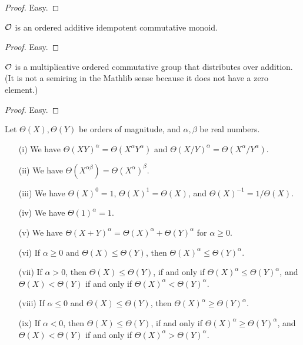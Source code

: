 \begin{proof}\leanok Easy.
\end{proof}

\begin{corollary}\label{add-comm-mon}\leanok ${\mathcal O}$ is an ordered additive idempotent commutative monoid.
\end{corollary}

\begin{proof}\leanok Easy.
\end{proof}

\begin{lemma}\label{comm-semiring}\leanok ${\mathcal O}$ is a multiplicative ordered commutative group that distributes over addition.  (It is not a semiring in the Mathlib sense because it does not have a zero element.)
\end{lemma}

\begin{proof}\leanok Easy.
\end{proof}

\begin{lemma}\label{power-law}  Let $\Theta(X), \Theta(Y)$ be orders of magnitude, and $\alpha,\beta$ be real numbers.
    \begin{itemize}
    \item[(i)] We have $\Theta(XY)^\alpha = \Theta(X^\alpha Y^\alpha)$ and $\Theta(X/Y)^\alpha = \Theta(X^\alpha / Y^\alpha)$.
    \item[(ii)] We have $\Theta(X^{\alpha \beta}) = \Theta(X^\alpha)^\beta$.  
    \item[(iii)] We have $\Theta(X)^0 = 1$, $\Theta(X)^1 = \Theta(X)$, and $\Theta(X)^{-1} = 1 / \Theta(X)$.
    \item[(iv)] We have $\Theta(1)^\alpha = 1$.
    \item[(v)] We have $\Theta(X+Y)^\alpha = \Theta(X)^\alpha + \Theta(Y)^\alpha$ for $\alpha \geq 0$.
    \item[(vi)]  If $\alpha \geq 0$ and $\Theta(X) \leq \Theta(Y)$, then $\Theta(X)^\alpha \leq \Theta(Y)^\alpha$.
    \item[(vii)] If $\alpha > 0$, then $\Theta(X) \leq \Theta(Y)$, if and only if $\Theta(X)^\alpha \leq \Theta(Y)^\alpha$, and $\Theta(X) < \Theta(Y)$ if and only if $\Theta(X)^\alpha < \Theta(Y)^\alpha$.
    \item[(viii)] If $\alpha \leq 0$ and $\Theta(X) \leq \Theta(Y)$, then $\Theta(X)^\alpha \geq \Theta(Y)^\alpha$.
    \item[(ix)] If $\alpha < 0$, then $\Theta(X) \leq \Theta(Y)$, if and only if $\Theta(X)^\alpha \geq \Theta(Y)^\alpha$, and $\Theta(X) < \Theta(Y)$ if and only if $\Theta(X)^\alpha > \Theta(Y)^\alpha$.   
    \end{itemize}
\end{lemma}

